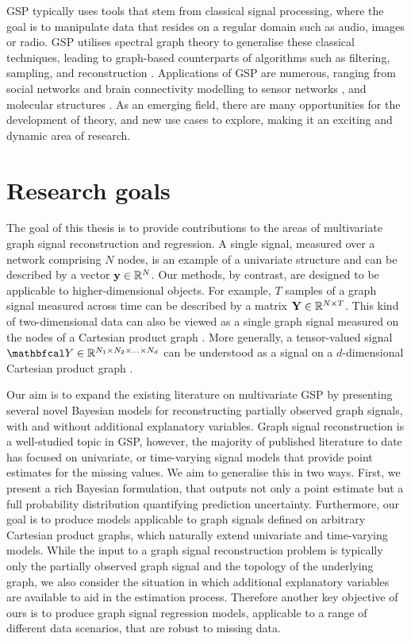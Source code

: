 \vspace{0.2cm}

GSP typically uses tools that stem from classical signal processing, where the goal is to manipulate data that resides on a regular domain such as audio, images or radio. GSP utilises spectral graph theory to generalise these classical techniques, leading to graph-based counterparts of algorithms such as filtering, sampling, and reconstruction \citep{Shuman2013}. Applications of GSP are numerous, ranging from social networks \citep{Dong2015} and brain connectivity modelling \citep{Huang2016} to sensor networks \citep{Zhu2012}, and molecular structures \citep{Kearnes2016}. As an emerging field, there are many opportunities for the development of theory, and new use cases to explore, making it an exciting and dynamic area of research. 

\section{Research goals}


The goal of this thesis is to provide contributions to the areas of multivariate graph signal reconstruction and regression. A single signal, measured over a network comprising $N$ nodes, is an example of a univariate structure and can be described by a vector $\mathbf{y} \in \mathbb{R}^N$. Our methods, by contrast, are designed to be applicable to higher-dimensional objects. For example, $T$ samples of a graph signal measured across time can be described by a matrix $\mathbf{Y} \in \mathbb{R}^{N \times T}$. This kind of two-dimensional data can also be viewed as a single graph signal measured on the nodes of a Cartesian product graph \citep{Imrich2000}. More generally, a tensor-valued signal $\Yt \in \R^{N_1 \times N_2 \times ... \times N_d}$ can be understood as a signal on a $d$-dimensional Cartesian product graph \citep{Stanley2020}. 


Our aim is to expand the existing literature on multivariate GSP by presenting several novel Bayesian models for reconstructing partially observed graph signals, with and without additional explanatory variables. Graph signal reconstruction is a well-studied topic in GSP, however, the majority of published literature to date has focused on univariate, or time-varying signal models that provide point estimates for the missing values. We aim to generalise this in two ways. First, we present a rich Bayesian formulation, that outputs not only a point estimate but a full probability distribution quantifying prediction uncertainty. Furthermore, our goal is to produce models applicable to graph signals defined on arbitrary Cartesian product graphs, which naturally extend univariate and time-varying models. While the input to a graph signal reconstruction problem is typically only the partially observed graph signal and the topology of the underlying graph, we also consider the situation in which additional explanatory variables are available to aid in the estimation process. Therefore another key objective of ours is to produce graph signal regression models, applicable to a range of different data scenarios, that are robust to missing data. 

